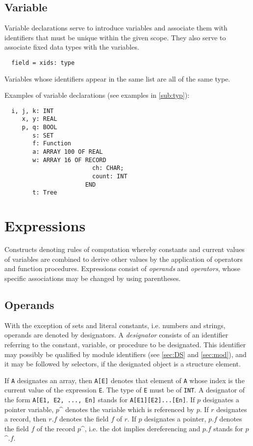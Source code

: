 \subsection{Variable}
\label{sub:var}
Variable declarations serve to introduce variables and associate them with identifiers that must be
unique within the given scope. They also serve to associate fixed data types with the variables.
\begin{verbatim}
  field = xids: type
\end{verbatim}
Variables whose identifiers appear in the same list are all of the same type.

Examples of variable declarations (see examples in \ref{sub:typ}):
\begin{verbatim}
  i, j, k: INT
     x, y: REAL
     p, q: BOOL
        s: SET
        f: Function
        a: ARRAY 100 OF REAL
        w: ARRAY 16 OF RECORD
                         ch: CHAR;
                         count: INT
                       END
        t: Tree
\end{verbatim}

\section{Expressions}
\label{sec:expr}
Constructs denoting rules of computation whereby constants and current values of variables
are combined to derive other values by the application of operators and function procedures.
Expressions consist of \emph{operands} and \emph{operators}, whose specific associations
may be changed by using parentheses.

\subsection{Operands}
\label{sub:opd}
With the exception of sets and literal constants, i.e. numbers and strings, operands are
denoted by designators. A \emph{designator} consists of an identifier referring to the
constant, variable, or procedure to be designated. This identifier may possibly be qualified
by module identifiers (see \ref{sec:DS} and \ref{sec:mod}), and it may be followed by
selectors, if the designated object is a structure element.

If \verb|A| designates an array, then \verb|A[E]| denotes that element of \verb|A| whose
index is the current value of the expression \verb|E|. The type of \verb|E| must be of
\verb|INT|. A designator of the form \verb|A[E1, E2, ..., En]| stands for \verb|A[E1][E2]...[En]|.
If $p$ designates a pointer variable, $p$\^{} denotes the variable which is referenced by
$p$. If $r$ designates a record, then $r.f$ denotes the field $f$ of $r$. If $p$ designates
a pointer, $p.f$ denotes the field $f$ of the record $p$\^{}, i.e. the dot implies
dereferencing and $p.f$ stands for $p$\^{}.$f$.

